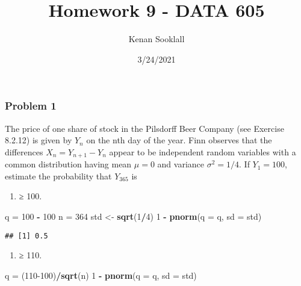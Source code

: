 \documentclass[
]{article}
\title{Homework 9 - DATA 605}
\author{Kenan Sooklall}
\date{3/24/2021}
\newenvironment{Shaded}{\begin{snugshade}}{\end{snugshade}}
\newcommand{\DataTypeTok}[1]{\textcolor[rgb]{0.13,0.29,0.53}{#1}}
\newcommand{\DecValTok}[1]{\textcolor[rgb]{0.00,0.00,0.81}{#1}}
\newcommand{\KeywordTok}[1]{\textcolor[rgb]{0.13,0.29,0.53}{\textbf{#1}}}
\newcommand{\NormalTok}[1]{#1}
\newcommand{\OperatorTok}[1]{\textcolor[rgb]{0.81,0.36,0.00}{\textbf{#1}}}
\newcommand{\StringTok}[1]{\textcolor[rgb]{0.31,0.60,0.02}{#1}}
\providecommand{\tightlist}{%
  \setlength{\itemsep}{0pt}\setlength{\parskip}{0pt}}
\begin{document}
\maketitle

\hypertarget{problem-1}{%
\subsubsection{Problem 1}\label{problem-1}}

The price of one share of stock in the Pilsdorff Beer Company (see
Exercise 8.2.12) is given by \(Y_n\) on the nth day of the year. Finn
observes that the differences \(X_n = Y_{n+1} − Y_n\) appear to be
independent random variables with a common distribution having mean
\(\mu = 0\) and variance \(\sigma^2 = 1/4\). If \(Y_1 = 100\), estimate
the probability that \(Y_{365}\) is

\begin{enumerate}
\def\labelenumi{(\alph{enumi})}
\tightlist
\item
  ≥ 100.
\end{enumerate}

\begin{Shaded}
\begin{Highlighting}[]
\NormalTok{q =}\StringTok{ }\DecValTok{100} \OperatorTok{-}\StringTok{ }\DecValTok{100}
\NormalTok{n =}\StringTok{ }\DecValTok{364}
\NormalTok{std <-}\StringTok{ }\KeywordTok{sqrt}\NormalTok{(}\DecValTok{1}\OperatorTok{/}\DecValTok{4}\NormalTok{)}
\DecValTok{1} \OperatorTok{-}\StringTok{ }\KeywordTok{pnorm}\NormalTok{(}\DataTypeTok{q =}\NormalTok{ q, }\DataTypeTok{sd =}\NormalTok{ std)}
\end{Highlighting}
\end{Shaded}

\begin{verbatim}
## [1] 0.5
\end{verbatim}

\begin{enumerate}
\def\labelenumi{(\alph{enumi})}
\setcounter{enumi}{1}
\tightlist
\item
  ≥ 110.
\end{enumerate}

\begin{Shaded}
\begin{Highlighting}[]
\NormalTok{q =}\StringTok{ }\NormalTok{(}\DecValTok{110-100}\NormalTok{)}\OperatorTok{/}\KeywordTok{sqrt}\NormalTok{(n)}
\DecValTok{1} \OperatorTok{-}\StringTok{ }\KeywordTok{pnorm}\NormalTok{(}\DataTypeTok{q =}\NormalTok{ q, }\DataTypeTok{sd =}\NormalTok{ std)}
\end{Highlighting}
\end{Shaded}
\end{document}
